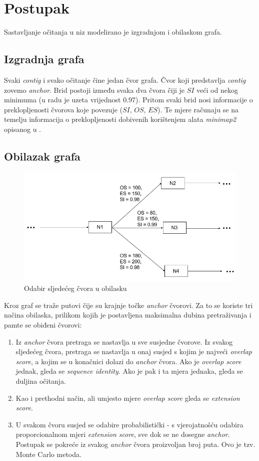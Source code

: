 \documentclass[times, utf8, seminar, numeric]{fer}
\begin{document}
\chapter{Postupak}
Sastavljanje očitanja u niz modelirano je izgradnjom i obilaskom grafa.
\section{Izgradnja grafa}
Svaki \textit{contig} i svako očitanje čine jedan čvor grafa. Čvor koji predstavlja \textit{contig} zovemo \textit{anchor}. Brid postoji između svaka dva čvora čiji je $SI$ veći od nekog minimuma (u radu je uzeta vrijednost $0.97$). Pritom svaki brid nosi informacije o preklopljenosti čvorova koje povezuje ($SI$, $OS$, $ES$). Te mjere računaju se na temelju informacija o preklopljenosti dobivenih korištenjem alata \textit{minimap2} opisanog u \cite{minimap2}.

\section{Obilazak grafa}

\begin{figure}[h]
	\centering
	\includegraphics[width=0.7\linewidth]{img/traversal}
	\caption{Odabir sljedećeg čvora u obilasku}
	\label{fig:traversal}
\end{figure}

\noindent
Kroz graf se traže putovi čije su krajnje točke \textit{anchor} čvorovi. Za to se koriste tri načina obilaska, prilikom kojih je postavljena maksimalna dubina pretraživanja i pamte se obiđeni čvorovi:
\begin{enumerate}
	\item Iz \textit{anchor} čvora pretraga se nastavlja u sve susjedne čvorove. Iz svakog sljedećeg čvora, pretraga se nastavlja u onaj susjed s kojim je najveći \textit{overlap score}, a kojim se u konačnici dolazi do \textit{anchor} čvora. Ako je \textit{overlap score} jednak, gleda se \textit{sequence identity}. Ako je pak i ta mjera jednaka, gleda se duljina očitanja.
	\item Kao i prethodni način, ali umjesto mjere \textit{overlap score} gleda se \textit{extension score}.
	\item U svakom čvoru susjed se odabire probabilistički - s vjerojatnošću odabira proporcionalnom mjeri \textit{extension score}, sve dok se ne dosegne \textit{anchor}. Postupak se pokreće iz svakog \textit{anchor} čvora proizvoljan broj puta. Ovo je tzv. Monte Carlo metoda.
\end{enumerate}
\end{document}

